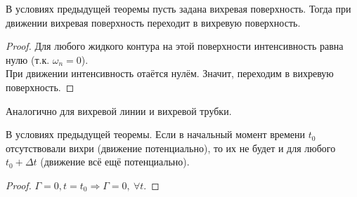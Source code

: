 \begin{theorem}
  В условиях предыдущей теоремы пусть задана вихревая поверхность. Тогда при движении вихревая поверхность переходит в вихревую поверхность.
\end{theorem}
\begin{proof}
  Для любого жидкого контура на этой поверхности интенсивность равна нулю (т.к. $\omega_n = 0$).\\
  При движении интенсивность отаётся нулём. Значит, переходим в вихревую поверхность.
\end{proof}
\begin{addition}
  Аналогично для вихревой линии и вихревой трубки.
\end{addition}
\begin{theorem}
  В условиях предыдущей теоремы. Если в начальный момент времени $t_0$ отсутствовали вихри (движение потенциально), то их не будет и для любого $t_0 + \Delta t$ (движение всё ещё потенциально).
\end{theorem}
\begin{proof}
  $\Gamma = 0, t = t_0 \Rightarrow \Gamma = 0,\ \forall t.$
\end{proof}
